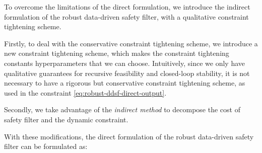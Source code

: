 To overcome the limitations of the direct formulation, we introduce the indirect formulation of the robust data-driven safety filter, with a qualitative constraint tightening scheme.

Firstly, to deal with the conservative constraint tightening scheme, we introduce a new constraint tightening scheme, which makes the constraint tightening constants hyperparameters that we can choose.
Intuitively, since we only have qualitative guarantees for recursive feasibility and closed-loop stability, it is not necessary to have a rigorous but conservative constraint tightening scheme, as used in the constraint \cref{eq:robust-ddsf-direct-output}.

Secondly, we take advantage of the \emph{indirect method} to decompose the cost of safety filter and the dynamic constraint.

With these modifications, the direct formulation of the robust data-driven safety filter can be formulated as:

